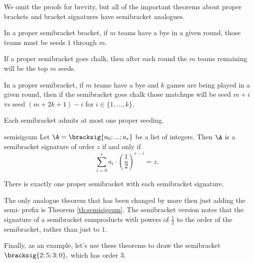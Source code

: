 {    We omit the proofs for brevity, but all of the important theorems about proper brackets and bracket signatures have semibracket analogues.

    \begin{lemma}{}{}
        In a proper semibracket bracket, if $m$ teams have a bye in a given round, those teams must be seeds $1$ through $m$.
    \end{lemma}

    \begin{lemma}{}{}
        If a proper semibracket goes chalk, then after each round the $m$ teams remaining will be the top $m$ seeds.
    \end{lemma}

    \begin{lemma}{}{}
        In a proper semibracket, if $m$ teams have a bye and $k$ games are being played in a given round, then if the semibracket goes chalk those matchups will be seed $m + i$ vs seed $(m + 2k + 1) - i$ for $i \in \{1, ..., k\}.$
    \end{lemma}

    \begin{theorem}{}{}
        Each semibracket admits at most one proper seeding.
    \end{theorem}

    \begin{theorem}{}{semisigsum}
    Let $\A = \bracksig{a_0; ...; a_r}$ be a list of integers. Then $\A$ is a semibracket signature of order $z$ if and only if $$\sum_{i=0}^r a_i \cdot \left(\frac{1}{2}\right)^{r - i} = z.$$
    \end{theorem}

    \begin{theorem}{}{}
        There is exactly one proper semibracket with each semibracket signature.
    \end{theorem}

    The only analogue theorem that has been changed by more then just adding the semi- prefix is Theorem \ref{th:semisigsum}. The semibracket version notes that the signature of a semibracket sumproducts with powers of $\frac{1}{2}$ to the order of the semibracket, rather than just to $1.$

    Finally, as an example, let's use these theorems to draw the semibracket $\bracksig{2;5;3;0},$ which has order $3.$

}